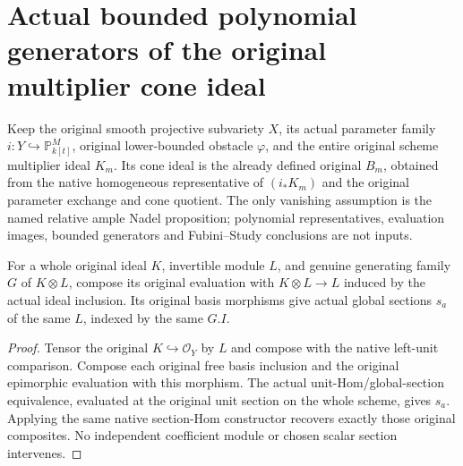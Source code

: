 \section{Actual bounded polynomial generators of the original multiplier cone ideal}
\label{sec:c0n-cone-generators}

Keep the original smooth projective subvariety $X$, its actual parameter
family $i:Y\hookrightarrow\mathbb P^M_{k[t]}$, original lower-bounded
obstacle $\varphi$, and the entire original scheme multiplier ideal
$K_m$.  Its cone ideal is the already defined original $B_m$, obtained
from the native homogeneous representative of $(i_*K_m)$ and the original
parameter exchange and cone quotient.  The only vanishing assumption is
the named relative ample Nadel proposition; polynomial representatives,
evaluation images, bounded generators and Fubini--Study conclusions are
not inputs.

\begin{lemma}
\label{lem:c0n-cone-generators-included-sections}
\leanok
For a whole original ideal $K$, invertible module $L$, and genuine
generating family $G$ of $K\otimes L$, compose its original evaluation
with $K\otimes L\to L$ induced by the actual ideal inclusion.  Its
original basis morphisms give actual global sections $s_a$ of the same
$L$, indexed by the same $G.I$.
\end{lemma}
\begin{proof}
Tensor the original $K\hookrightarrow\mathcal O_Y$ by $L$ and compose
with the native left-unit comparison.  Compose each original free basis
inclusion and the original epimorphic evaluation with this morphism.
The actual unit-Hom/global-section equivalence, evaluated at the original
unit section on the whole scheme, gives $s_a$.  Applying the same native
section-Hom constructor recovers exactly those original composites.
No independent coefficient module or chosen scalar section intervenes.
\end{proof}

